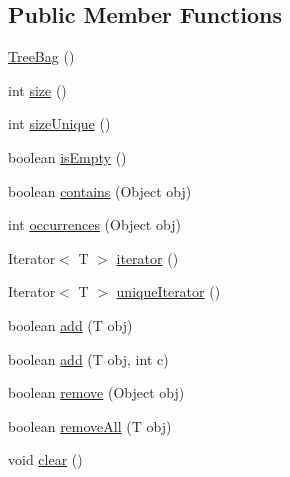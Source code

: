 \subsection*{Public Member Functions}
\begin{DoxyCompactItemize}
\item 
\hyperlink{classorg_1_1tzi_1_1use_1_1util_1_1collections_1_1_tree_bag_3_01_t_01_4_a2a9befd758984d3e91b491e996ce0adb}{Tree\-Bag} ()
\item 
int \hyperlink{classorg_1_1tzi_1_1use_1_1util_1_1collections_1_1_tree_bag_3_01_t_01_4_a9a7425e65c59316113c63e296d7a44f9}{size} ()
\item 
int \hyperlink{classorg_1_1tzi_1_1use_1_1util_1_1collections_1_1_tree_bag_3_01_t_01_4_ae60efaade63a9da6159ca8eac235e250}{size\-Unique} ()
\item 
boolean \hyperlink{classorg_1_1tzi_1_1use_1_1util_1_1collections_1_1_tree_bag_3_01_t_01_4_a9de3fbaff496cd7162d04e0fc2f6d6c8}{is\-Empty} ()
\item 
boolean \hyperlink{classorg_1_1tzi_1_1use_1_1util_1_1collections_1_1_tree_bag_3_01_t_01_4_aa822867b0dfaf568fdcd1c5e5f9548b3}{contains} (Object obj)
\item 
int \hyperlink{classorg_1_1tzi_1_1use_1_1util_1_1collections_1_1_tree_bag_3_01_t_01_4_a67799d75ac2778fabd84e75c2dc15341}{occurrences} (Object obj)
\item 
Iterator$<$ T $>$ \hyperlink{classorg_1_1tzi_1_1use_1_1util_1_1collections_1_1_tree_bag_3_01_t_01_4_a6db2f21221bd30906294f463b4e6459f}{iterator} ()
\item 
Iterator$<$ T $>$ \hyperlink{classorg_1_1tzi_1_1use_1_1util_1_1collections_1_1_tree_bag_3_01_t_01_4_ad5cf4d5b2e374f914ab12850466bc736}{unique\-Iterator} ()
\item 
boolean \hyperlink{classorg_1_1tzi_1_1use_1_1util_1_1collections_1_1_tree_bag_3_01_t_01_4_ad7d9dac35625bfb0f5c56d4397ab105b}{add} (T obj)
\item 
boolean \hyperlink{classorg_1_1tzi_1_1use_1_1util_1_1collections_1_1_tree_bag_3_01_t_01_4_a495484e0a554986fae2d075cc1c1004f}{add} (T obj, int c)
\item 
boolean \hyperlink{classorg_1_1tzi_1_1use_1_1util_1_1collections_1_1_tree_bag_3_01_t_01_4_a99217050f8b462620a2c37be7d12e319}{remove} (Object obj)
\item 
boolean \hyperlink{classorg_1_1tzi_1_1use_1_1util_1_1collections_1_1_tree_bag_3_01_t_01_4_a07606039edbca4d48b15a36e7eead606}{remove\-All} (T obj)
\item 
void \hyperlink{classorg_1_1tzi_1_1use_1_1util_1_1collections_1_1_tree_bag_3_01_t_01_4_aab9e71d8b6cd8a7a351a3d091d307bca}{clear} ()
\end{DoxyCompactItemize}


